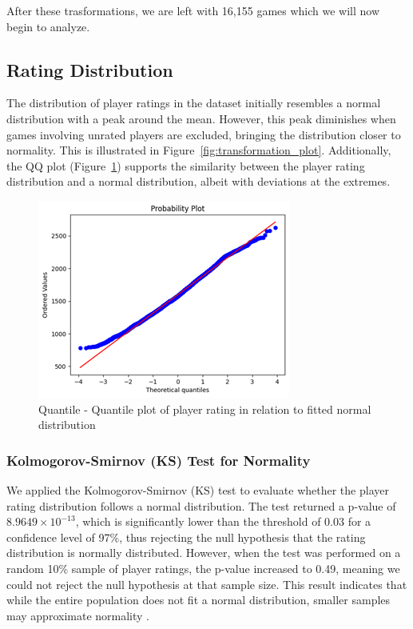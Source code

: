 \documentclass[conference]{IEEEtran}
\begin{document}
After these trasformations, we are left with 16,155 games which we will now begin to analyze.

\subsection{Rating Distribution}
The distribution of player ratings in the dataset initially resembles a normal distribution with a peak around the mean. However, this peak diminishes when games involving unrated players are excluded, bringing the distribution closer to normality. This is illustrated in Figure~\ref{fig:transformation_plot}. Additionally, the QQ plot (Figure~\ref{fig:rating_qq}) supports the similarity between the player rating distribution and a normal distribution, albeit with deviations at the extremes.

\begin{figure}[H]
    \centering
    \includegraphics[width=0.8\linewidth]{ratingqq.png}
    \caption{Quantile - Quantile plot of player rating in relation to fitted normal distribution}
    \label{fig:rating_qq}
\end{figure}


\subsubsection*{Kolmogorov-Smirnov (KS) Test for Normality}
We applied the Kolmogorov-Smirnov (KS) test to evaluate whether the player rating distribution follows a normal distribution. The test returned a p-value of \(8.9649 \times 10^{-13}\), which is significantly lower than the threshold of \(0.03\) for a confidence level of 97\%, thus rejecting the null hypothesis that the rating distribution is normally distributed. However, when the test was performed on a random 10\% sample of player ratings, the p-value increased to 0.49, meaning we could not reject the null hypothesis at that sample size. This result indicates that while the entire population does not fit a normal distribution, smaller samples may approximate normality \cite{kssample}.
\end{document}
